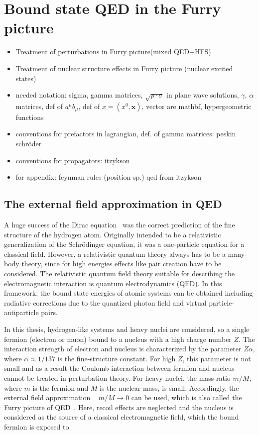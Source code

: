 \chapter{Bound state QED in the Furry picture}
\label{ch:furry_pic}
\begin{itemize}
\item Treatment of perturbations in Furry picture(mixed QED+HFS)
\item Treatment of nuclear structure effects in Furry picture (nuclear excited states)
\item needed notation: sigma, gamma matrices, $\sqrt{p\cdot \sigma}$ in plane wave solutions, $\gamma$, $\alpha$ matrices, def of $a^\mu b_\mu$, def of $x=(x^0,\mathbf{x})$, vector are mathbf, hypergeometric functions

\item conventions for prefactors in lagrangian, def. of gamma matrices: peskin schröder
\item conventions for propagators: itzykson
\item for appendix:  feynman rules (position sp.) qed from itzykson
\end{itemize} 
\section{The external field approximation in QED}
\label{sec:ext_field}
A huge success of the Dirac equation~\cite{dirac1928} was the correct prediction of the fine structure of the hydrogen atom. Originally intended to be a relativistic generalization of the Schrödinger equation, it was a one-particle equation for a classical field. 
However, a relativistic quantum theory always has to be a many-body theory, since for high energies effects like pair creation have to be considered. The relativistic quantum field theory suitable for describing the electromagnetic interaction is quantum electrodynamics (QED). In this framework, the bound state energies of atomic systems can be obtained including radiative corrections due to the quantized photon field and virtual particle-antiparticle pairs. 

In this thesis, hydrogen-like systems and heavy nuclei are considered, so a single fermion (electron or muon) bound to a nucleus with a high charge number $Z$. The interaction strength of electron and nucleus is characterized by the parameter $Z\alpha$, where $\alpha \approx 1/137$ is the fine-structure constant. For high $Z$, this parameter is not small and as a result the Coulomb interaction between fermion and nucleus cannot be treated in perturbation theory. 
For heavy nuclei, the mass ratio $m/M$, where $m$ is the fermion and $M$ is the nuclear mass, is small. Accordingly, the external field approximation ~\cite[\mbox{Section~13.6}]{weinberg2005} $m/M \rightarrow 0$ can be used, which is also called the Furry picture of QED~\cite{furry1951}. Here, recoil effects are neglected and the nucleus is considered as the source of a classical electromagnetic field, which the bound fermion is exposed to.

